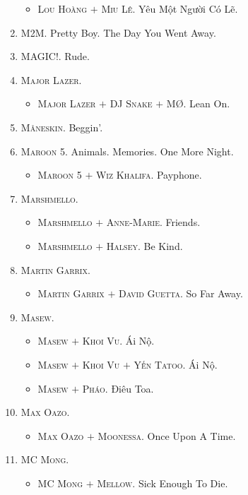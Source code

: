 \documentclass[oneside]{book}
\numberwithin{equation}{section}
\begin{document}
\begin{enumerate}
	\begin{itemize}
		\item \textsc{Lou Hoàng $+$ Miu Lê.} Yêu Một Người Có Lẽ.
	\end{itemize}
	\item \textsc{M2M.} Pretty Boy. The Day You Went Away.
	\item \textsc{MAGIC!.} Rude.
	\item \textsc{Major Lazer.}
	\begin{itemize}
		\item \textsc{Major Lazer $+$ DJ Snake $+$ M\O.} Lean On.
	\end{itemize}
	\item \textsc{M\r{a}neskin.} Beggin'.
	\item \textsc{Maroon 5.} Animals. Memories. One More Night.
	\begin{itemize}
		\item \textsc{Maroon 5 $+$ Wiz Khalifa.} Payphone.
	\end{itemize}
	\item \textsc{Marshmello.}
	\begin{itemize}
		\item \textsc{Marshmello $+$ Anne-Marie.} Friends.
		\item \textsc{Marshmello $+$ Halsey.} Be Kind.
	\end{itemize}
	\item \textsc{Martin Garrix.}
	\begin{itemize}
		\item \textsc{Martin Garrix $+$ David Guetta.} So Far Away.
	\end{itemize}
	\item \textsc{Masew.}
	\begin{itemize}
		\item \textsc{Masew $+$ Khoi Vu.} Ái Nộ.
		\item \textsc{Masew $+$ Khoi Vu $+$ Yến Tatoo.} Ái Nộ.
		\item \textsc{Masew $+$ Pháo.} Điêu Toa.
	\end{itemize}
	\item \textsc{Max Oazo.}
	\begin{itemize}
		\item \textsc{Max Oazo $+$ Moonessa.} Once Upon A Time.
	\end{itemize}
	\item \textsc{MC Mong.}
	\begin{itemize}
		\item \textsc{MC Mong $+$ Mellow.} Sick Enough To Die.

\end{itemize}
\end{enumerate}
\end{document}
